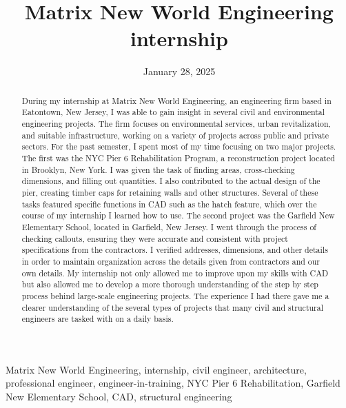 \documentclass[12pt,conference,onecolumn]{IEEEtran}
\title{Matrix New World Engineering internship}
\author{\IEEEauthorblockN{Ryan Cohen}\IEEEauthorblockA{Science \& Engineering\\Manalapan High School\\Englishtown, NJ\\425rcohen@frhsd.com}}
\date{January 28, 2025}
\newcommand{\keywords}{Matrix New World Engineering, internship, civil engineer, architecture, professional engineer, engineer-in-training, NYC Pier 6 Rehabilitation, Garfield New Elementary School, CAD, structural engineering}
\begin{document}
\maketitle 

\begin{abstract}
During my internship at Matrix New World Engineering, an engineering firm based in Eatontown, New Jersey, I was able to gain insight in several civil and environmental engineering projects. The firm focuses on environmental services, urban revitalization, and suitable infrastructure, working on a variety of projects across public and private sectors. For the past semester, I spent most of my time focusing on two major projects. The first was the NYC Pier 6 Rehabilitation Program, a reconstruction project located in Brooklyn, New York. I was given the task of finding areas, cross-checking dimensions, and filling out quantities. I also contributed to the actual design of the pier, creating timber caps for retaining walls and other structures. Several of these tasks featured specific functions in CAD such as the hatch feature, which over the course of my internship I learned how to use. The second project was the Garfield New Elementary School, located in Garfield, New Jersey. I went through the process of checking callouts, ensuring they were accurate and consistent with project specifications from the contractors. I verified addresses, dimensions, and other details in order to maintain organization across the details given from contractors and our own details. My internship not only allowed me to improve upon my skills with CAD but also allowed me to develop a more thorough understanding of the step by step process behind large-scale engineering projects. The experience I had there gave me a clearer understanding of the several types of projects that many civil and structural engineers are tasked with on a daily basis.
\end{abstract}

\begin{IEEEkeywords}
\keywords
\end{IEEEkeywords}
\end{document}
